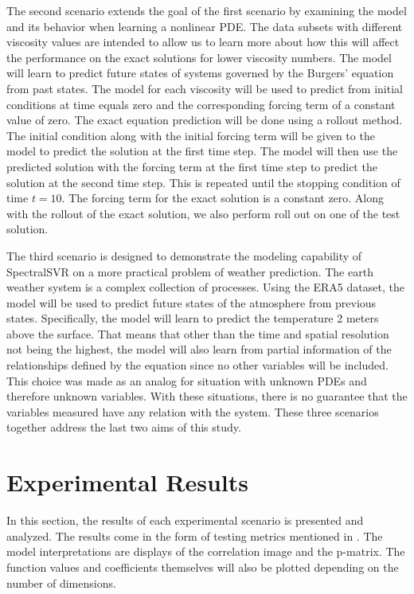 The second scenario extends the goal of the first scenario by examining the model and its behavior when learning a nonlinear PDE\@. The data subsets with different viscosity values are intended to allow us to learn more about how this will affect the performance on the exact solutions for lower viscosity numbers. The model will learn to predict future states of systems governed by the Burgers' equation from past states. The model for each viscosity will be used to predict  from initial conditions at time equals zero and the corresponding forcing term of a constant value of zero. The exact equation prediction will be done using a rollout method. The initial condition along with the initial forcing term will be given to the model to predict the solution at the first time step. The model will then use the predicted solution with the forcing term at the first time step to predict the solution at the second time step. This is repeated until the stopping condition of time \(t=10\). The forcing term for the exact solution is a constant zero. Along with the rollout of the exact solution, we also perform roll out on one of the test solution.

The third scenario is designed to demonstrate the modeling capability of SpectralSVR on a more practical problem of weather prediction. The earth weather system is a complex collection of processes. Using the ERA5 dataset, the model will be used to predict future states of the atmosphere from previous states. Specifically, the model will learn to predict the temperature 2 meters above the surface. That means that other than the time and spatial resolution not being the highest, the model will also learn from partial information of the relationships defined by the equation since no other variables will be included. This choice was made as an analog for situation with unknown PDEs and therefore unknown variables. With these situations, there is no guarantee that the variables measured have any relation with the system. These three scenarios together address the last two aims of this study.

\section{Experimental Results}\label{sec:experimental_results}
\noindent In this section, the results of each experimental scenario is presented and analyzed. The results come in the form of testing metrics mentioned in . %
The model interpretations are displays of the correlation image and the p-matrix. The function values and coefficients themselves will also be plotted depending on the number of dimensions.


